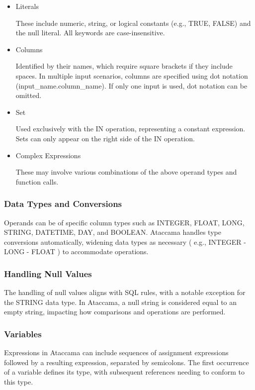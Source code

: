 \begin{itemize}
    \item  Literals
    
    These include numeric, string, or logical constants (e.g., TRUE, FALSE) and the null literal. All keywords are case-insensitive.

    \item Columns
    
    Identified by their names, which require square brackets if they include spaces. In multiple input scenarios, columns are specified using dot notation (input\_name.column\_name). If only one input is used, dot notation can be omitted.

    \item Set
    
    Used exclusively with the IN operation, representing a constant expression. Sets can only appear on the right side of the IN operation.

    \item Complex Expressions
    
    These may involve various combinations of the above operand types and function calls.
\end{itemize}

\subsubsection{Data Types and Conversions}

Operands can be of specific column types such as INTEGER, FLOAT, LONG, STRING, DATETIME, DAY, and BOOLEAN. Ataccama handles type conversions automatically, widening data types as necessary ( e.g., INTEGER - LONG - FLOAT ) to accommodate operations.

\subsubsection{Handling Null Values}

The handling of null values aligns with SQL rules, with a notable exception for the STRING data type. In Ataccama, a null string is considered equal to an empty string, impacting how comparisons and operations are performed.

\subsubsection{Variables}

Expressions in Ataccama can include sequences of assignment expressions followed by a resulting expression, separated by semicolons. The first occurrence of a variable defines its type, with subsequent references needing to conform to this type.

